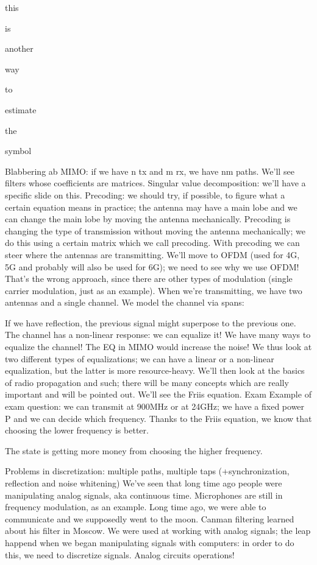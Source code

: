 {this

is

another

way

to

estimate

the

symbol

Blabbering ab MIMO: if we have n tx and m rx, we have nm paths.
We'll see filters whose coefficients are matrices.
Singular value decomposition: we'll have a specific slide on this.
Precoding: we should try, if possible, to figure what a certain equation means in practice; the antenna may have a main lobe and we can change the main lobe by moving the antenna mechanically.
Precoding is changing the type of transmission without moving the antenna mechanically;
we do this using a certain matrix which we call precoding.
With precoding we can steer where the antennas are transmitting.
We'll move to OFDM (used for 4G, 5G and probably will also be used for 6G); we need to see why we use OFDM! That's the wrong approach, since there are other types of modulation (single carrier modulation, just as an example).
When we're transmitting, we have two antennas and a single channel.
We model the channel via spans:

If we have reflection, the previous signal might superpose to the previous one.
The channel has a non-linear response: we can equalize it!
We have many ways to equalize the channel!
The EQ in MIMO would increase the noise! We thus look at two different types of equalizations; we can have a linear or a non-linear equalization, but the latter is more resource-heavy.
We'll then look at the basics of radio propagation and such; there will be many concepts which are really important and will be pointed out.
We'll see the Friis equation.
Exam Example of exam question: we can transmit at 900MHz or at 24GHz; we have a fixed power P and we can decide which frequency.
Thanks to the Friis equation, we know that choosing the lower frequency is better.

The state is getting more money from choosing the higher frequency.

Problems in discretization: multiple paths, multiple taps
(+synchronization, reflection and noise whitening)
We've seen that long time ago people were manipulating analog signals, aka continuous time.
Microphones are still in frequency modulation, as an example.
Long time ago, we were able to communicate and we supposedly went to the moon.
Canman filtering learned about his filter in Moscow.
We were used at working with analog signals; the leap happend when we began manipulating signals with computers: in order to do this, we need to discretize signals.
Analog circuits operations!

}
